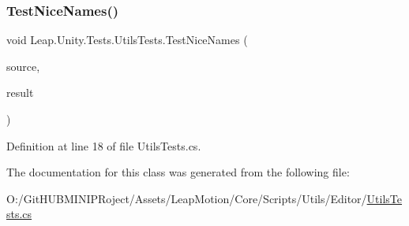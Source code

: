 \subsubsection{\texorpdfstring{TestNiceNames()}{TestNiceNames()}}
{\footnotesize\ttfamily void Leap.\+Unity.\+Tests.\+Utils\+Tests.\+Test\+Nice\+Names (\begin{DoxyParamCaption}\item[{\mbox{[}\+Values(\char`\"{}\+\_\+private\+Var\char`\"{},
                                      \char`\"{}mult\+By32\char`\"{},
                                      \char`\"{}the\+\_\+key\+\_\+code\char`\"{},
                                      \char`\"{}\+Camel\+Case\+Too\char`\"{},
                                      \char`\"{}\+\_\+is2\+\_\+equal\+To\+\_\+5\char`\"{},
                                      \char`\"{}\+Get\+The\+S\+C\+U\+B\+A\+Now\char`\"{},
                                      \char`\"{}m\+\_\+private\+Var\char`\"{},
                                      \char`\"{}k\+Constant\+Var\char`\"{})\mbox{]} string}]{source,  }\item[{\mbox{[}\+Values(\char`\"{}\+Private Var\char`\"{},
                                      \char`\"{}\+Mult By 32\char`\"{},
                                      \char`\"{}\+The Key Code\char`\"{},
                                      \char`\"{}\+Camel Case Too\char`\"{},
                                      \char`\"{}\+Is 2 Equal To 5\char`\"{},
                                      \char`\"{}\+Get The S\+C\+U\+B\+A Now\char`\"{},
                                      \char`\"{}\+Private Var\char`\"{},
                                      \char`\"{}\+Constant Var\char`\"{})\mbox{]} string}]{result }\end{DoxyParamCaption})}



Definition at line 18 of file Utils\+Tests.\+cs.



The documentation for this class was generated from the following file\+:\begin{DoxyCompactItemize}
\item 
O\+:/\+Git\+H\+U\+B\+M\+I\+N\+I\+P\+Roject/\+Assets/\+Leap\+Motion/\+Core/\+Scripts/\+Utils/\+Editor/\mbox{\hyperlink{_utils_tests_8cs}{Utils\+Tests.\+cs}}\end{DoxyCompactItemize}
